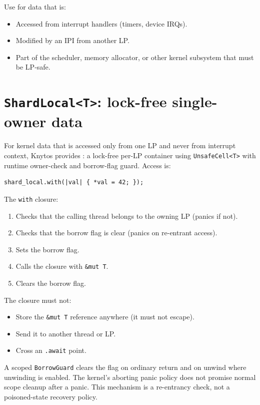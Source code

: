 Use  for data that is:
\begin{itemize}
    \item Accessed from interrupt handlers (timers, device IRQs).
    \item Modified by an IPI from another LP.
    \item Part of the scheduler, memory allocator, or other kernel subsystem
        that must be LP-safe.
\end{itemize}

\section{\texttt{ShardLocal<T>}: lock-free single-owner data}

\label{sec:shard-local}

For kernel data that is accessed only from one LP and never from interrupt
context, Knytos provides : a lock-free per-LP
container using \texttt{UnsafeCell<T>} with runtime owner-check and borrow-flag
guard. Access is:

\begin{lstlisting}[style=rustCode]
shard_local.with(|val| { *val = 42; });
\end{lstlisting}

The \texttt{with} closure:
\begin{enumerate}
    \item Checks that the calling thread belongs to the owning LP (panics if not).
    \item Checks that the borrow flag is clear (panics on re-entrant access).
    \item Sets the borrow flag.
    \item Calls the closure with \texttt{\&mut T}.
    \item Clears the borrow flag.
\end{enumerate}

The closure must not:
\begin{itemize}
    \item Store the \texttt{\&mut T} reference anywhere (it must not escape).
    \item Send it to another thread or LP.
    \item Cross an \texttt{.await} point.
\end{itemize}

A scoped \texttt{BorrowGuard} clears the flag on ordinary return and on unwind
where unwinding is enabled. The kernel's aborting panic policy does not promise
normal scope cleanup after a panic. This mechanism is a re-entrancy check, not a
poisoned-state recovery policy.

